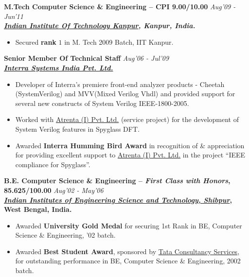 \documentclass[9pt]{article}
\newenvironment{changemargin}[2]{%
  \begin{list}{}{%
    \setlength{\topsep}{0pt}%
    \setlength{\leftmargin}{#1}%
    \setlength{\rightmargin}{#2}%
    \setlength{\listparindent}{\parindent}%
    \setlength{\itemindent}{\parindent}%
    \setlength{\parsep}{\parskip}%
  }%
  \item[]}{\end{list}
}
\newenvironment{body} {
	\vspace*{-16pt}
	\begin{changemargin}{-0.25in}{-0.5in}
  }	
	{\end{changemargin}
}
\begin{document}
\begin{body}
 \medskip
	\textbf{M.Tech Computer Science \& Engineering -- CPI 9.00/10.00}{} \hfill \emph{Aug'09 - Jun'11}{} \\
	\textbf{\emph{\href{http://www.iitk.ac.in/}{Indian Institute Of Technology Kanpur}, Kanpur, India.}{}} \\
	\begin{itemize} \itemsep -0pt
		\item Secured \textbf{rank} $1$ in M. Tech 2009 Batch, IIT Kanpur.
	\end{itemize}

 \medskip
        \textbf{Senior Member Of Technical Staff} \hfill \emph{Aug'06 - Jul'09}\\
       	\textbf{\emph{\href{http://www.interrasystems.com/}{Interra Systems India Pvt. Ltd.}}}
	\begin{itemize} \itemsep -0pt
		\item Developer of Interra's premiere front-end analyzer products - Cheetah (SystemVerilog) and MVV(Mixed Verilog Vhdl) and 
		provided support for several new constructs of System Verilog IEEE-1800-2005. 
		\item Worked with \href{http://www.atrenta.com/}{Atrenta (I) Pvt. Ltd.} (service project) for the development of System Verilog features in Spyglass DFT.
		\item Awarded \textbf{Interra Humming Bird Award} in recognition of \& appreciation for providing excellent support to \href{}{Atrenta (I) Pvt. Ltd.} in the project ``IEEE compliance for Spyglass''.
	\end{itemize}

  \medskip
	\textbf{B.E. Computer Science \& Engineering -- \emph{First Class with Honors}, 85.625/100.00} \hfill \emph{Aug'02 - May'06} \\
	\textbf{\emph{\href{http://www.iiests.ac.in/}{Indian Institutes of Engineering Science and Technology, Shibpur}}, West Bengal, India.}\\
	\begin{itemize} \itemsep -0pt
		\item Awarded \textbf{University Gold Medal} for securing 1st Rank in BE, Computer Science \& Engineering, '02 batch.
		\item Awarded \textbf{Best Student Award}, sponsored by \href{http://www.tcs.com}{Tata Consultancy Services}, for outstanding performance in BE, Computer Science \& Engineering, 2002 batch.
	\end{itemize}
\end{body}
\end{document}
